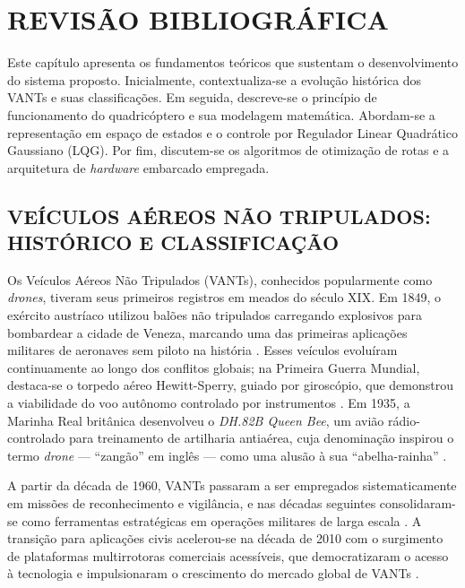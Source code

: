 \chapter{REVISÃO BIBLIOGRÁFICA}\label{cap_revisao}

Este capítulo apresenta os fundamentos teóricos que sustentam o desenvolvimento do sistema proposto. Inicialmente, contextualiza-se a evolução histórica dos VANTs e suas classificações. Em seguida, descreve-se o princípio de funcionamento do quadricóptero e sua modelagem matemática. Abordam-se a representação em espaço de estados e o controle por Regulador Linear Quadrático Gaussiano (LQG). Por fim, discutem-se os algoritmos de otimização de rotas e a arquitetura de \textit{hardware} embarcado empregada.

\section{VEÍCULOS AÉREOS NÃO TRIPULADOS: HISTÓRICO E CLASSIFICAÇÃO}

Os Veículos Aéreos Não Tripulados (VANTs), conhecidos popularmente como \textit{drones}, tiveram seus primeiros registros em meados do século XIX. Em 1849, o exército austríaco utilizou balões não tripulados carregando explosivos para bombardear a cidade de Veneza, marcando uma das primeiras aplicações militares de aeronaves sem piloto na história \cite{mori2020, zaloga2008}. Esses veículos evoluíram continuamente ao longo dos conflitos globais; na Primeira Guerra Mundial, destaca-se o torpedo aéreo Hewitt-Sperry, guiado por giroscópio, que demonstrou a viabilidade do voo autônomo controlado por instrumentos \cite{newcome2004}. Em 1935, a Marinha Real britânica desenvolveu o \textit{DH.82B Queen Bee}, um avião rádio-controlado para treinamento de artilharia antiaérea, cuja denominação inspirou o termo \textit{drone} --- ``zangão'' em inglês --- como uma alusão à sua ``abelha-rainha'' \cite{zaloga2008, newcome2004}.

A partir da década de 1960, VANTs passaram a ser empregados sistematicamente em missões de reconhecimento e vigilância, e nas décadas seguintes consolidaram-se como ferramentas estratégicas em operações militares de larga escala \cite{ayamga2021}. A transição para aplicações civis acelerou-se na década de 2010 com o surgimento de plataformas multirrotoras comerciais acessíveis, que democratizaram o acesso à tecnologia e impulsionaram o crescimento do mercado global de VANTs \cite{sivakumar2021, kapustina2021}.

